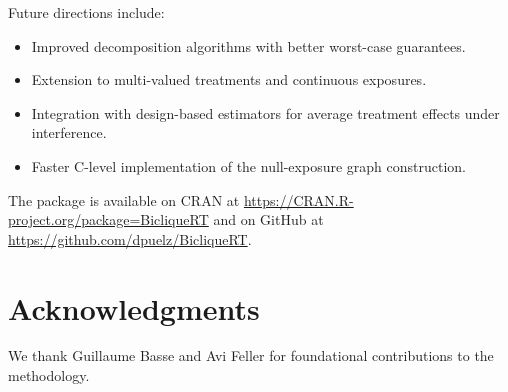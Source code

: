 \documentclass[article]{jss}
\begin{document}
Future directions include:
\begin{itemize}
  \item Improved decomposition algorithms with better worst-case
        guarantees.
  \item Extension to multi-valued treatments and continuous exposures.
  \item Integration with design-based estimators for average treatment
        effects under interference.
  \item Faster C-level implementation of the null-exposure graph
        construction.
\end{itemize}

The package is available on CRAN at
\url{https://CRAN.R-project.org/package=BicliqueRT} and on GitHub at
\url{https://github.com/dpuelz/BicliqueRT}.



\section*{Acknowledgments}

We thank Guillaume Basse and Avi Feller for foundational contributions
to the methodology.




\end{document}
